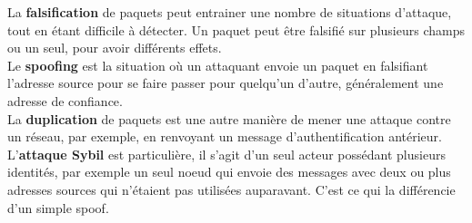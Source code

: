 			La \textbf{falsification} de paquets peut entrainer une nombre de situations d'attaque, tout en étant difficile à détecter. Un paquet peut être falsifié sur plusieurs champs ou un seul, pour avoir différents effets.\\
			Le \textbf{spoofing} est la situation où un attaquant envoie un paquet en falsifiant l'adresse source pour se faire passer pour quelqu'un d'autre, généralement une adresse de confiance.\\
			La \textbf{duplication} de paquets est une autre manière de mener une attaque contre un réseau, par exemple, en renvoyant un message d'authentification antérieur.\\
			L'\textbf{attaque Sybil} est particulière, il s'agit d'un seul acteur possédant plusieurs identités, par exemple un seul noeud qui envoie des messages avec deux ou plus adresses sources qui n'étaient pas utilisées auparavant. C'est ce qui la différencie d'un simple spoof.


